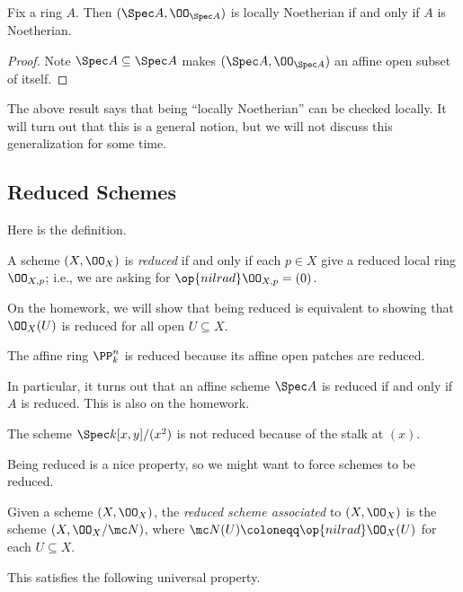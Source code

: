 \documentclass[../notes.tex]{subfiles}
\begin{document}
\begin{cor}
	Fix a ring $A$. Then $(\Spec A,\OO_{\Spec A})$ is locally Noetherian if and only if $A$ is Noetherian.
\end{cor}
\begin{proof}
	Note $\Spec A\subseteq\Spec A$ makes $(\Spec A,\OO_{\Spec A})$ an affine open subset of itself.
\end{proof}
\begin{remark}
	The above result says that being ``locally Noetherian'' can be checked locally. It will turn out that this is a general notion, but we will not discuss this generalization for some time.
\end{remark}

\subsection{Reduced Schemes}
Here is the definition.
\begin{definition}[Reduced]
	A scheme $(X,\OO_X)$ is \textit{reduced} if and only if each $p\in X$ give a reduced local ring $\OO_{X,p}$; i.e., we are asking for $\op{nilrad}\OO_{X,p}=(0)$.
\end{definition}
\begin{remark}
	On the homework, we will show that being reduced is equivalent to showing that $\OO_X(U)$ is reduced for all open $U\subseteq X$.
\end{remark}
\begin{example}
	The affine ring $\PP^n_k$ is reduced because its affine open patches are reduced.
\end{example}
\begin{remark}
	In particular, it turns out that an affine scheme $\Spec A$ is reduced if and only if $A$ is reduced. This is also on the homework.
\end{remark}
\begin{nex}
	The scheme $\Spec k[x,y]/(x^2)$ is not reduced because of the stalk at $(x)$.
\end{nex}
Being reduced is a nice property, so we might want to force schemes to be reduced.
\begin{definition}
	Given a scheme $(X,\OO_X)$, the \textit{reduced scheme associated} to $(X,\OO_X)$ is the scheme $(X,\OO_X/\mc N)$, where $\mc N(U)\coloneqq\op{nilrad}\OO_X(U)$ for each $U\subseteq X$.
\end{definition}
This satisfies the following universal property.
\end{document}
